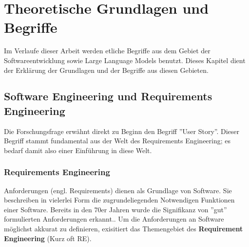 \chapter{Theoretische Grundlagen und Begriffe}\label{ch:Theoretische Grundlagen und Begriffe}

Im Verlaufe dieser Arbeit werden etliche Begriffe aus dem Gebiet der Softwareentwicklung sowie Large Language Models benutzt. Dieses Kapitel dient der Erklärung der Grundlagen und der Begriffe aus diesen Gebieten.

\section{Software Engineering und Requirements Engineering}\label{ch:Software Engineering und Requirements Engineering}

Die Forschungsfrage  erwähnt direkt zu Beginn den Begriff ''User Story''. Dieser Begriff stammt fundamental aus der Welt des Requirements Engineering; es bedarf damit also einer Einführung in diese Welt. 

\subsection{Requirements Engineering}\label{ch:Requirements Engineering}

Anforderungen (engl. Requirements) dienen als Grundlage von Software. Sie beschreiben in vielerlei Form die zugrundeliegenden Notwendigen Funktionen einer Software. Bereits in den 70er Jahren wurde die Signifikanz von ''gut'' formulierten Anforderungen erkannt.. Um die Anforderungen an Software möglichst akkurat zu definieren, exisitiert das Themengebiet des \textbf{Requirement Engineering} (Kurz oft RE).


